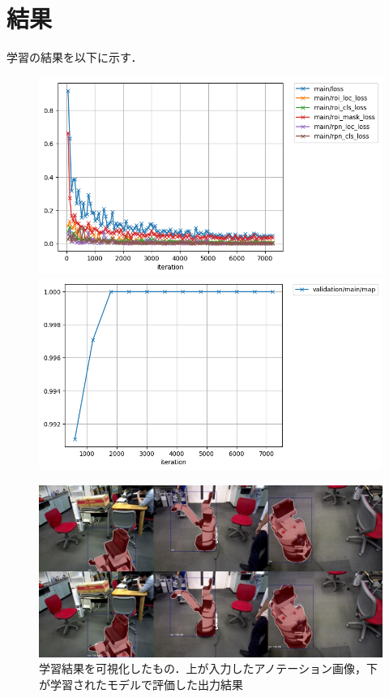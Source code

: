 \documentclass[onecolumn]{preport}
\begin{document}
\section{結果}
学習の結果を以下に示す．
\begin{figure}[htbp]
  \begin{center}
    \begin{minipage}{0.45\columnwidth}
      \includegraphics[width=\columnwidth]{loss.png}
      \caption{}
      \label{figure:loss}
    \end{minipage}
    \begin{minipage}{0.45\columnwidth}
      \includegraphics[width=\columnwidth]{accuracy.png}
      \caption{}
      \label{figure:accuracy}
    \end{minipage}
  \end{center}
\end{figure}

\begin{figure}[htbp]
 \begin{center}
   \includegraphics[width=0.5\columnwidth]{latest1.jpg}
   \caption{学習結果を可視化したもの．上が入力したアノテーション画像，下が学習されたモデルで評価した出力結果}
  \label{figure:annotated}
 \end{center}
\end{figure}
\end{document}
